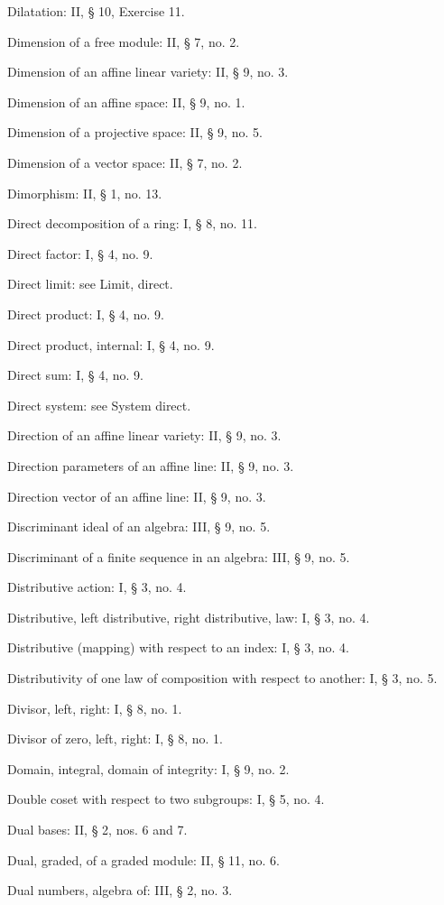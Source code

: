 Dilatation: II, § 10, Exercise 11.

Dimension of a free module: II, § 7, no. 2.

Dimension of an affine linear variety: II, § 9, no. 3.

Dimension of an affine space: II, § 9, no. 1.

Dimension of a projective space: II, § 9, no. 5.

Dimension of a vector space: II, § 7, no. 2.

Dimorphism: II, § 1, no. 13.

Direct decomposition of a ring: I, § 8, no. 11.

Direct factor: I, § 4, no. 9.

Direct limit: see Limit, direct.

Direct product: I, § 4, no. 9.

Direct product, internal: I, § 4, no. 9.

Direct sum: I, § 4, no. 9.

Direct system: see System direct.

Direction of an affine linear variety: II, § 9, no. 3.

Direction parameters of an affine line: II, § 9, no. 3.

Direction vector of an affine line: II, § 9, no. 3.

Discriminant ideal of an algebra: III, § 9, no. 5.

Discriminant of a finite sequence in an algebra: III, § 9, no. 5.

Distributive action: I, § 3, no. 4.

Distributive, left distributive, right distributive, law: I, § 3, no. 4.

Distributive (mapping) with respect to an index: I, § 3, no. 4.

Distributivity of one law of composition with respect to another: I, § 3, no. 5.

Divisor, left, right: I, § 8, no. 1.

Divisor of zero, left, right: I, § 8, no. 1.

Domain, integral, domain of integrity: I, § 9, no. 2.

Double coset with respect to two subgroups: I, § 5, no. 4.

Dual bases: II, § 2, nos. 6 and 7.

Dual, graded, of a graded module: II, § 11, no. 6.

Dual numbers, algebra of: III, § 2, no. 3.


